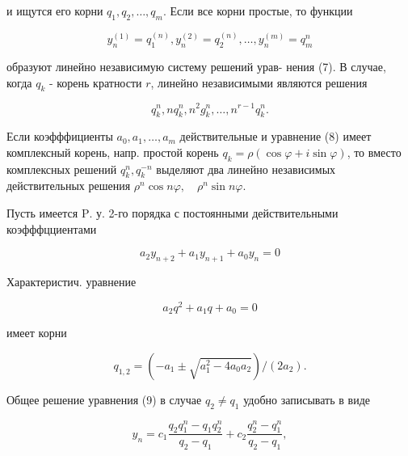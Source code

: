 \documentclass[10pt]{article}
\begin{document}
и ищутся его корни $q_{1}, q_{2}, \ldots, q_{m}$. Если все корни простые, то функции



\[

y_{n}^{(1)}=q_{1}^{(n)}, y_{n}^{(2)}=q_{2}^{(n)}, \ldots, y_{n}^{(m)}=q_{m}^{n}

\]



образуют линейно независимую систему решений урав- нения (7). В случае, когда $q_{k}$ - корень кратности $r$, линейно независимыми являются решения



\[

q_{k}^{n}, n q_{k}^{n}, n^{2} g_{k}^{n}, \ldots, n^{r-1} q_{k}^{n} .

\]



Если коэфффициенты $a_{0}, a_{1}, \ldots, a_{m}$ действительные и уравнение (8) имеет комплексный корень, напр. простой корень $q_{k}=\rho(\cos \varphi+i \sin \varphi)$, то вместо комплексных решений $q_{k}^{n}, q_{k}^{-n}$ выделяют два линейно независимых действительных решения $\rho^{n} \cos n \varphi, \quad \rho^{n} \sin n \varphi$.



Пусть имеется $\mathrm{P}$. у. 2-го порядка с постоянными действительными коэфффцциентами



\[

a_{2} y_{n+2}+a_{1} y_{n+1}+a_{0} y_{n}=0

\]



Характеристич. уравнение



\[

a_{2} q^{2}+a_{1} q+a_{0}=0

\]



имеет корни



\[

q_{1,2}=\left(-a_{1} \pm \sqrt{a_{1}^{2}-4 a_{0} a_{2}}\right) /\left(2 a_{2}\right) .

\]



Общее решение уравнения (9) в случае $q_{2} \neq q_{1}$ удобно записывать в виде



\[

y_{n}=c_{1} \frac{q_{2} q_{1}^{n}-q_{1} q_{2}^{n}}{q_{2}-q_{1}}+c_{2} \frac{q_{2}^{n}-q_{1}^{n}}{q_{2}-q_{1}},

\]
\end{document}
